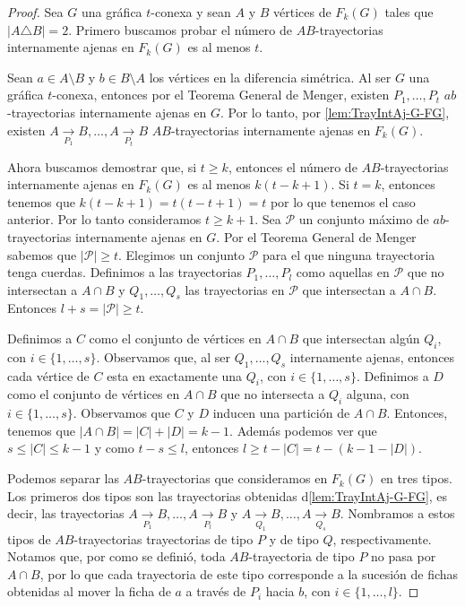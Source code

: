 \begin{proof}
    Sea $G$ una gr\'afica $t$-conexa y sean $A$ y $B$ v\'ertices de $F_{k}(G)$
    tales que $|A \triangle B| = 2$. Primero buscamos probar el n\'umero de
    $AB$-trayectorias internamente ajenas en $F_{k}(G)$ es al menos $t$. 
    
    Sean $a \in A \setminus B$ y $b \in B \setminus A$ los v\'ertices en la
    diferencia sim\'etrica. Al ser $G$ una gr\'afica $t$-conexa, entonces por el
    Teorema General de Menger, existen $P_{1}, \dots, P_{t}$ $ab$-trayectorias
    internamente ajenas en $G$. Por lo tanto, por \cref{lem:TrayIntAj-G-FG},
    existen $A \xrightarrow[P_1]{}  B, \dots, A \xrightarrow[P_t]{}  B$
    $AB$-trayectorias internamente ajenas en $F_{k}(G)$. 

    Ahora buscamos demostrar que, si $t \geq k$, entonces el n\'umero de
    $AB$-trayectorias internamente ajenas en $F_{k}(G)$ es al menos $k(t- k
    +1)$. Si $t=k$, entonces tenemos que $k(t - k + 1) = t(t-t+1) = t$ por lo
    que tenemos el caso anterior. Por lo tanto consideramos  $t \geq k + 1$. Sea
    $\mathcal{P}$ un conjunto m\'aximo de $ab$-trayectorias internamente ajenas
    en $G$. Por el Teorema General de Menger sabemos que $|\mathcal{P}| \ge t$.
    Elegimos un conjunto $\mathcal{P}$ para el que ninguna trayectoria tenga
    cuerdas. Definimos a las trayectorias $P_{1}, \dots, P_{l}$ como aquellas en
    $\mathcal{P}$ que no intersectan a $A \cap B$ y $Q_{1}, \dots, Q_{s}$ las
    trayectorias en $\mathcal{P}$ que intersectan a $A \cap B$. Entonces $l + s
    = |\mathcal{P}| \ge t$.

    Definimos a $C$ como el conjunto de v\'ertices en $A \cap B$ que intersectan
    alg\'un $Q_i$, con $i \in \{1, \dots, s\}$. Observamos que, al ser $Q_1,
    \dots, Q_s$ internamente ajenas, entonces cada v\'ertice de $C$ esta en
    exactamente una $Q_i$, con $i \in \{1, \dots, s\}$. Definimos a $D$ como el
    conjunto de v\'ertices en $A \cap B$ que no intersecta a $Q_i$ alguna, con
    $i \in \{1, \dots, s\}$. Observamos que $C$ y $D$ inducen una partici\'on
    de $A \cap B$. Entonces, tenemos que $|A\cap B| = |C| + |D| = k-1$. Adem\'as
    podemos ver que $s \leq |C| \leq k-1$ y como $ t - s \leq l$, entonces $l
    \geq t -|C| = t- (k-1-|D|)$.

    Podemos separar las $AB$-trayectorias que consideramos en $F_{k}(G)$ en tres
    tipos. Los primeros dos tipos son las trayectorias obtenidas
    d\cref{lem:TrayIntAj-G-FG}, es decir, las trayectorias $A
    \xrightarrow[P_1]{}  B, \dots, A \xrightarrow[P_l]{}  B$ y $A
    \xrightarrow[Q_1]{}  B, \dots, A \xrightarrow[Q_s]{}  B$. Nombramos a estos
    tipos de $AB$-trayectorias trayectorias de tipo $P$ y de tipo $Q$,
    respectivamente. Notamos que, por como se defini\'o, toda $AB$-trayectoria
    de tipo $P$ no pasa por $A\cap B$, por lo que cada trayectoria de este tipo
    corresponde a la sucesi\'on de fichas obtenidas al mover la ficha de $a$ a
    trav\'es de $P_i$ hacia $b$, con $i \in \{1, \dots, l\}$.
    

\end{proof}

